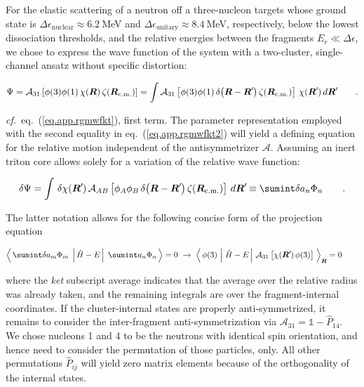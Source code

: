 \documentclass[aps,onecolumn,preprintnumbers,amsmath,amssymb,nofootinbib,superscriptaddress,notitlepage]{revtex4-1}
\newcommand{\eref}[1]{eq.~(\ref{#1})}
\newcommand{\cf}{\textit{cf.}~}
\newcommand{\ve}[1]{\ensuremath{\boldsymbol{#1}}}
\newcommand{\rcm}{\ensuremath{\ve{R}_\text{\scriptsize{c.m.}}}}
\newcommand*{\mprime}{^{\prime}\mkern-1.2mu}
\newcommand{\me}[3] {\left\langle\,#1\,\left.\left|\,#2\,\right|\right.\,#3\,\right\rangle}
\newcommand{\mer}[3] {\left\langle\,#1\,\left|\left.\,#2\,\right|\,#3\,\right.\right\rangle_{\ve{R}}}
\begin{document}
For the elastic scattering of a neutron off a three-nucleon targets whose ground state is 
$\Delta\epsilon_\text{nuclear}\approx6.2~$MeV and
$\Delta\epsilon_\text{unitary}\approx8.4~$MeV, respectively, below the lowest dissociation thresholds,
and the relative energies between the fragments $E_r\ll\Delta\epsilon$,
we chose to express the wave function of the system with a two-cluster, single-channel ansatz
without specific distortion:

\begin{equation}\label{eq.app.rgmwfkt2}
\Psi
=
\mathcal{A}_{31}\left[\phi(3)\phi(1)\,\chi(\ve{R})\,\zeta(\rcm)\right]
=
\int\mathcal{A}_{31}\left[\phi(3)\phi(1)\,\delta\big(\ve{R}-\ve{R}\mprime\big)\,\zeta(\rcm)\right]\,\chi(\ve{R}\mprime)\,d\ve{R}\mprime
\qquad.
\end{equation}

\cf\eref{eq.app.rgmwfkt}, first term. The parameter representation employed with the second equality in \eref{eq.app.rgmwfkt2}
will yield a defining equation for the relative motion independent of the antisymmetrizer $\mathcal{A}$.
Assuming an inert triton core allows solely for a variation of the relative wave function:

\begin{equation}\label{eq.app.rgmwfkt}
\delta\Psi
=
\int\,\delta\chi(\ve{R}\mprime)\,\mathcal{A}_{AB}\left[\phi_A\phi_B\,\delta\big(\ve{R}-\ve{R}\mprime\big)\,\zeta(\rcm)\right]\,d\ve{R}\mprime
\equiv
\sumint \delta a_n\Phi_n
\qquad.
\end{equation}

The latter notation allows for the following concise form of the projection equation

\begin{equation}\label{eq.app.rgmwfkt}
\me{\sumint \delta a_m\Phi_m}{\hat{H}-E}{ \sumint a_n\Phi_n}=0
~\to~\mer{\phi(3)}{\hat{H}-E}{\mathcal{A}_{31}\left[\chi(\ve{R}\mprime)\,\phi(3)\right]}=0
\qquad
\end{equation}

where the {\it ket} subscript average indicates that the average over the relative radius was already taken,
and the remaining integrals are over the fragment-internal coordinates. If the cluster-internal states are properly
anti-symmetrized, it remains to consider the inter-fragment anti-symmetrization via
 $\mathcal{A}_{31}=\mathbb{1}-\hat{P}_{14}$.
We chose nucleons 1 and 4 to be the neutrons with identical spin orientation, and hence need to consider the permutation of
those particles, only. All other permutations $\hat{P}_{ij}$ will yield zero matrix elements because of the orthogonality of
the internal states.
\end{document}
